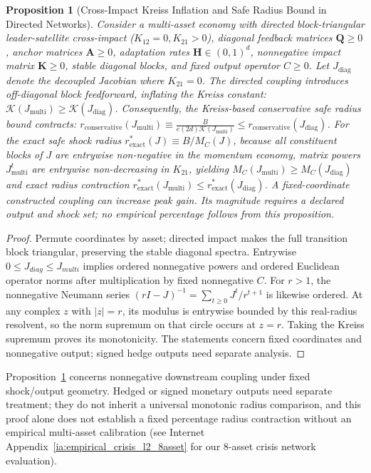 \documentclass[12pt]{article}
\newtheorem{proposition}[theorem]{Proposition}
\theoremstyle{definition}
\theoremstyle{remark}
\begin{document}
\begin{proposition}[Cross-Impact Kreiss Inflation and Safe Radius Bound in Directed Networks]
\label{prop:cross_kreiss}
Consider a multi-asset economy with directed block-triangular leader-satellite cross-impact ($K_{12} = 0, K_{21} > 0$), diagonal feedback matrices $\mathbf{Q} \ge 0$, anchor matrices $\mathbf{A} \ge 0$, adaptation rates $\mathbf{H} \in (0, 1)^d$, nonnegative impact matrix $\mathbf K\ge0$, stable diagonal blocks, and fixed output operator $C\ge0$. Let $J_{\text{diag}}$ denote the decoupled Jacobian where $K_{21} = 0$.
The directed coupling introduces off-diagonal block feedforward, inflating the Kreiss constant: $\mathcal{K}(J_{\text{multi}}) \ge \mathcal{K}(J_{\text{diag}})$. Consequently, the Kreiss-based conservative safe radius bound contracts: $r_{\text{conservative}}(J_{\text{multi}}) \equiv \frac{B}{e (2d) \mathcal{K}(J_{\text{multi}})} \le r_{\text{conservative}}(J_{\text{diag}})$.
For the exact safe shock radius $r^*_{\text{exact}}(J) \equiv B / M_C(J)$, because all constituent blocks of $J$ are entrywise non-negative in the momentum economy, matrix powers $J_{\text{multi}}^t$ are entrywise non-decreasing in $K_{21}$, yielding $M_C(J_{\text{multi}}) \ge M_C(J_{\text{diag}})$ and exact radius contraction $r^*_{\text{exact}}(J_{\text{multi}}) \le r^*_{\text{exact}}(J_{\text{diag}})$. A fixed-coordinate constructed coupling can increase peak gain. Its magnitude requires a declared output and shock set; no empirical percentage follows from this proposition.
\end{proposition}
\begin{proof}
Permute coordinates by asset; directed impact makes the full transition block triangular, preserving the stable diagonal spectra. Entrywise $0\le J_{diag}\le J_{multi}$ implies ordered nonnegative powers and ordered Euclidean operator norms after multiplication by fixed nonnegative $C$. For $r>1$, the nonnegative Neumann series $(rI-J)^{-1}=\sum_{t\ge0}J^t/r^{t+1}$ is likewise ordered. At any complex $z$ with $|z|=r$, its modulus is entrywise bounded by this real-radius resolvent, so the norm supremum on that circle occurs at $z=r$. Taking the Kreiss supremum proves its monotonicity. The statements concern fixed coordinates and nonnegative output; signed hedge outputs need separate analysis.
\end{proof}


Proposition~\ref{prop:cross_kreiss} concerns nonnegative downstream coupling under fixed shock/output geometry. Hedged or signed monetary outputs need separate treatment; they do not inherit a universal monotonic radius comparison, and this proof alone does not establish a fixed percentage radius contraction without an empirical multi-asset calibration (see Internet Appendix~\ref{ia:empirical_crisis_l2_8asset} for our 8-asset crisis network evaluation).
\end{document}
